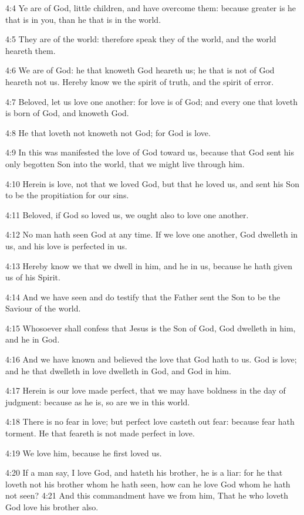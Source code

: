 4:4 Ye are of God, little children, and have overcome them: because greater is he that is in you, than he that is in the world.

4:5 They are of the world: therefore speak they of the world, and the world heareth them.

4:6 We are of God: he that knoweth God heareth us; he that is not of God heareth not us. Hereby know we the spirit of truth, and the spirit of error.

4:7 Beloved, let us love one another: for love is of God; and every one that loveth is born of God, and knoweth God.

4:8 He that loveth not knoweth not God; for God is love.

4:9 In this was manifested the love of God toward us, because that God sent his only begotten Son into the world, that we might live through him.

4:10 Herein is love, not that we loved God, but that he loved us, and sent his Son to be the propitiation for our sins.

4:11 Beloved, if God so loved us, we ought also to love one another.

4:12 No man hath seen God at any time. If we love one another, God dwelleth in us, and his love is perfected in us.

4:13 Hereby know we that we dwell in him, and he in us, because he hath given us of his Spirit.

4:14 And we have seen and do testify that the Father sent the Son to be the Saviour of the world.

4:15 Whosoever shall confess that Jesus is the Son of God, God dwelleth in him, and he in God.

4:16 And we have known and believed the love that God hath to us. God is love; and he that dwelleth in love dwelleth in God, and God in him.

4:17 Herein is our love made perfect, that we may have boldness in the day of judgment: because as he is, so are we in this world.

4:18 There is no fear in love; but perfect love casteth out fear: because fear hath torment. He that feareth is not made perfect in love.

4:19 We love him, because he first loved us.

4:20 If a man say, I love God, and hateth his brother, he is a liar: for he that loveth not his brother whom he hath seen, how can he love God whom he hath not seen?  4:21 And this commandment have we from him, That he who loveth God love his brother also.

